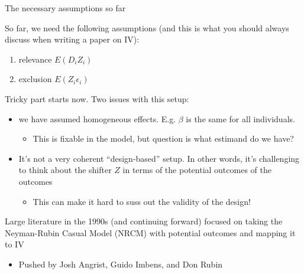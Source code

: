 \documentclass[notes,11pt, aspectratio=169]{beamer}
\newenvironment{wideitemize}{\itemize\addtolength{\itemsep}{10pt}}{\enditemize}
\begin{document}
\begin{frame}{The necessary assumptions so far}
  \begin{wideitemize}
  \item So far, we need the following assumptions (and this is what
    you should always discuss when writing a paper on IV):
    \begin{enumerate}
    \item   relevance $E(D_{i}Z_{i}) $
    \item exclusion $E(Z_{i}\epsilon_{i})$
    \end{enumerate}
  \item Tricky part starts now. Two issues with this setup:
    \begin{itemize}
    \item we have assumed homogeneous effects. E.g. $\beta$ is the
      same for all individuals.
      \begin{itemize}
      \item This is fixable in the model, but question is what
        estimand do we have?
      \end{itemize}
    \item It's not a very coherent ``design-based'' setup. In other
      words, it's challenging to think about the shifter $Z$ in terms
      of the potential outcomes of the outcomes
      \begin{itemize}
      \item This can make it hard to suss out the validity of the design!
      \end{itemize}
    \end{itemize}
  \item Large literature in the 1990s (and continuing forward) focused
    on taking the Neyman-Rubin Casual Model (NRCM) with potential
    outcomes and mapping it to IV
    \begin{itemize}
    \item Pushed by Josh Angrist, Guido Imbens, and Don Rubin
    \end{itemize}
  \end{wideitemize}
\end{frame}
\end{document}
